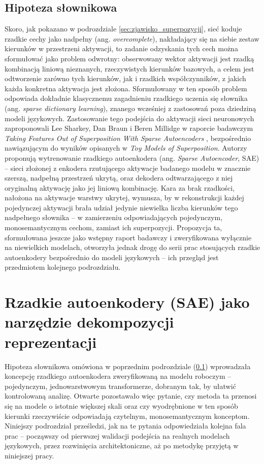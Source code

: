 \subsection{Hipoteza słownikowa}
\label{sec:hipoteza_slownikowa}
Skoro, jak pokazano w podrozdziale \ref{sec:zjawisko_superpozycji}, sieć koduje rzadkie cechy jako nadpełny (ang. \textit{overcomplete}), nakładający się na siebie zestaw kierunków w przestrzeni aktywacji, to zadanie odzyskania tych cech można sformułować jako problem odwrotny: obserwowany wektor aktywacji jest rzadką kombinacją liniową nieznanych, rzeczywistych kierunków bazowych, a celem jest odtworzenie zarówno tych kierunków, jak i rzadkich współczynników, z jakich każda konkretna aktywacja jest złożona. Sformułowany w ten sposób problem odpowiada dokładnie klasycznemu zagadnieniu rzadkiego uczenia się słownika (ang. \textit{sparse dictionary learning}), znanego wcześniej z zastosowań poza dziedziną modeli językowych. \newline
Zastosowanie tego podejścia do aktywacji sieci neuronowych zaproponowali Lee Sharkey, Dan Braun i Beren Millidge w raporcie badawczym \textit{Taking Features Out of Superposition With Sparse Autoencoders} \cite{sharkey_2022_taking_features_out_of_superposition}, bezpośrednio nawiązującym do wyników opisanych w \textit{Toy Models of Superposition}. Autorzy proponują wytrenowanie rzadkiego autoenkodera (ang. \textit{Sparse Autoencoder}, SAE) -- sieci złożonej z enkodera rzutującego aktywacje badanego modelu w znacznie szerszą, nadpełną przestrzeń ukrytą, oraz dekodera odtwarzającego z niej oryginalną aktywację jako jej liniową kombinację. Kara za brak rzadkości, nałożona na aktywacje warstwy ukrytej, wymusza, by w rekonstrukcji każdej pojedynczej aktywacji brała udział jedynie niewielka liczba kierunków tego nadpełnego słownika -- w zamierzeniu odpowiadających pojedynczym, monosemantycznym cechom, zamiast ich superpozycji. \newline
Propozycja ta, sformułowana jeszcze jako wstępny raport badawczy i zweryfikowana wyłącznie na niewielkich modelach, otworzyła jednak drogę do serii prac stosujących rzadkie autoenkodery bezpośrednio do modeli językowych -- ich przegląd jest przedmiotem kolejnego podrozdziału.

\section{Rzadkie autoenkodery (SAE) jako narzędzie dekompozycji reprezentacji}
\label{sec:sae_dekompozycja}
Hipoteza słownikowa omówiona w poprzednim podrozdziale (\ref{sec:hipoteza_slownikowa}) wprowadzała koncepcję rzadkiego autoenkodera zweryfikowaną na modelu roboczym -- pojedynczym, jednowarstwowym transformerze, dobranym tak, by ułatwić kontrolowaną analizę. Otwarte pozostawało więc pytanie, czy metoda ta przenosi się na modele o istotnie większej skali oraz czy wyodrębnione w ten sposób kierunki rzeczywiście odpowiadają czytelnym, monosemantycznym konceptom. Niniejszy podrozdział prześledzi, jak na te pytania odpowiedziała kolejna fala prac -- począwszy od pierwszej walidacji podejścia na realnych modelach językowych, przez rozwinięcia architektoniczne, aż po metodykę przyjętą w niniejszej pracy.

